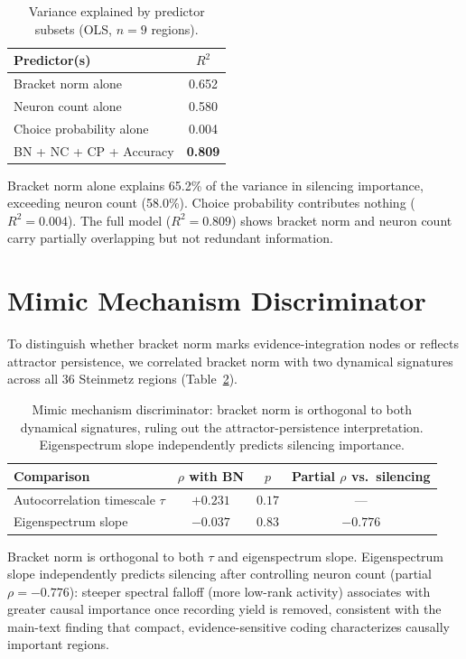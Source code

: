 \documentclass[9pt,lineno]{elife}
\begin{document}
\begin{table}[h]
\centering
\caption{Variance explained by predictor subsets (OLS, $n = 9$ regions).}
\label{tab:joint}
\begin{tabular}{lc}
\toprule
Predictor(s) & $R^2$ \\
\midrule
Bracket norm alone & 0.652 \\
Neuron count alone & 0.580 \\
Choice probability alone & 0.004 \\
BN + NC + CP + Accuracy & \textbf{0.809} \\
\bottomrule
\end{tabular}
\end{table}

Bracket norm alone explains 65.2\% of the variance in silencing importance, exceeding neuron count (58.0\%). Choice probability contributes nothing ($R^2 = 0.004$). The full model ($R^2 = 0.809$) shows bracket norm and neuron count carry partially overlapping but not redundant information.

\section{Mimic Mechanism Discriminator}
\label{app:mimic}

To distinguish whether bracket norm marks evidence-integration nodes or reflects attractor persistence, we correlated bracket norm with two dynamical signatures across all 36 Steinmetz regions (Table~\ref{tab:mimic}).

\begin{table}[h]
\centering
\caption{Mimic mechanism discriminator: bracket norm is orthogonal to both dynamical signatures, ruling out the attractor-persistence interpretation. Eigenspectrum slope independently predicts silencing importance.}
\label{tab:mimic}
\small
\begin{tabular}{lccc}
\toprule
Comparison & $\rho$ with BN & $p$ & Partial $\rho$ vs.\ silencing \\
\midrule
Autocorrelation timescale $\tau$ & $+0.231$ & $0.17$ & --- \\
Eigenspectrum slope & $-0.037$ & $0.83$ & $-0.776$ \\
\bottomrule
\end{tabular}
\end{table}

Bracket norm is orthogonal to both $\tau$ and eigenspectrum slope. Eigenspectrum slope independently predicts silencing after controlling neuron count (partial $\rho = -0.776$): steeper spectral falloff (more low-rank activity) associates with greater causal importance once recording yield is removed, consistent with the main-text finding that compact, evidence-sensitive coding characterizes causally important regions.
\end{document}
